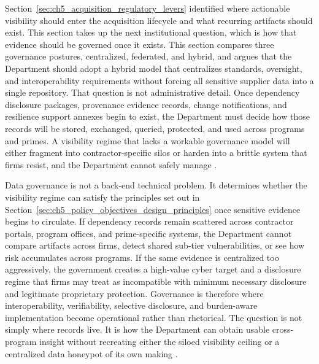 Section~\ref{sec:ch5_acquisition_regulatory_levers} identified where actionable visibility should enter the acquisition lifecycle and what recurring artifacts should exist. This section takes up the next institutional question, which is how that evidence should be governed once it exists. This section compares three governance postures, centralized, federated, and hybrid, and argues that the Department should adopt a hybrid model that centralizes standards, oversight, and interoperability requirements without forcing all sensitive supplier data into a single repository. That question is not administrative detail. Once dependency disclosure packages, provenance evidence records, change notifications, and resilience support annexes begin to exist, the Department must decide how those records will be stored, exchanged, queried, protected, and used across programs and primes. A visibility regime that lacks a workable governance model will either fragment into contractor-specific silos or harden into a brittle system that firms resist, and the Department cannot safely manage \parencite{ch5_nist800161r1upd1,ch5_dbb2025_illumination,U.S.GovernmentAccountabilityOffice2025}.

Data governance is not a back-end technical problem. It determines whether the visibility regime can satisfy the principles set out in Section~\ref{sec:ch5_policy_objectives_design_principles} once sensitive evidence begins to circulate. If dependency records remain scattered across contractor portals, program offices, and prime-specific systems, the Department cannot compare artifacts across firms, detect shared sub-tier vulnerabilities, or see how risk accumulates across programs. If the same evidence is centralized too aggressively, the government creates a high-value cyber target and a disclosure regime that firms may treat as incompatible with minimum necessary disclosure and legitimate proprietary protection. Governance is therefore where interoperability, verifiability, selective disclosure, and burden-aware implementation become operational rather than rhetorical. The question is not simply where records live. It is how the Department can obtain usable cross-program insight without recreating either the siloed visibility ceiling or a centralized data honeypot of its own making \parencite{ch5_nist800161r1upd1,ch5_dbb2025_illumination,U.S.GovernmentAccountabilityOffice2025,ch5_farsubpart423,ch5_dscsa_interop_2023}.

